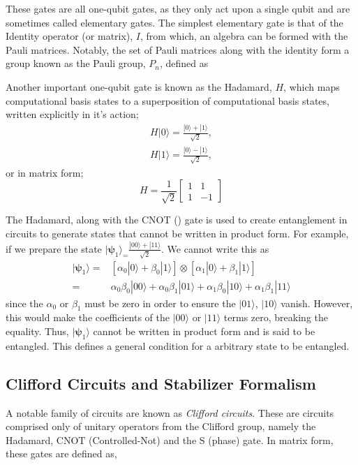 These gates are all one-qubit gates, as they only act upon a single qubit and are sometimes called elementary gates.
The simplest elementary gate is that of the Identity operator (or matrix), $I$, from which, an algebra
can be formed with the Pauli matrices. Notably, the set of Pauli matrices along with the identity form
a group known as the Pauli group, $P_n$, defined as

Another important one-qubit gate is
known as the Hadamard, $H$, which maps computational basis states to a superposition of computational basis states,
written explicitly in it's action;
\begin{align*}
    H |0\rangle = \frac{|0\rangle + |1\rangle}{\sqrt{2}}, \\
    H |1\rangle = \frac{|0\rangle - |1\rangle}{\sqrt{2}},
\end{align*}
or in matrix form;
\begin{equation*}
    H = \frac{1}{\sqrt{2}} \begin{bmatrix}
        1 & 1  \\
        1 & -1
    \end{bmatrix}
\end{equation*}

The Hadamard, along with the CNOT () gate is used to create entanglement in circuits to
generate states that cannot be written in product form. For example, if we prepare the state
$|{\bm\psi}_1\rangle_ = \frac{|00\rangle + |11\rangle}{\sqrt{2}}$. We cannot write this as
\begin{align*}
    |{\bm\psi}_1\rangle = & \left[ \alpha_0 |0\rangle + \beta_0|1\rangle\right] \otimes \left[\alpha_1 |0\rangle + \beta_1|1\rangle\right] \\
    =                     & \alpha_0\beta_0 |00\rangle + \alpha_0\beta_1|01\rangle + \alpha_1\beta_0|10\rangle + \alpha_1\beta_1|11\rangle
\end{align*}
since the $\alpha_0$ or $\beta_1$ must be zero in order to ensure the $|01\rangle$, $|10\rangle$ vanish.
However, this would make the coefficients of the $|00\rangle$
or $|11\rangle$ terms zero, breaking the equality. Thus, $|{\bm\psi}_1\rangle$ cannot be written in
product form and is said to be entangled. This defines a general condition for a arbitrary state to be entangled.


\subsection{Clifford Circuits and Stabilizer Formalism}
A notable family of circuits are known as \textit{Clifford circuits}. These are circuits comprised only of unitary operators
from the Clifford group, namely the Hadamard, CNOT (Controlled-Not) and the S (phase) gate. In matrix form, these gates are defined as,

